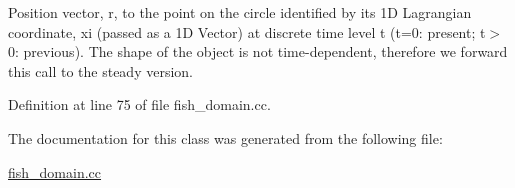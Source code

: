 Position vector, r, to the point on the circle identified by its 1D Lagrangian coordinate, xi (passed as a 1D Vector) at discrete time level t (t=0\+: present; t$>$0\+: previous). The shape of the object is not time-\/dependent, therefore we forward this call to the steady version. 



Definition at line 75 of file fish\+\_\+domain.\+cc.



The documentation for this class was generated from the following file\+:\begin{DoxyCompactItemize}
\item 
\hyperlink{fish__domain_8cc}{fish\+\_\+domain.\+cc}\end{DoxyCompactItemize}
